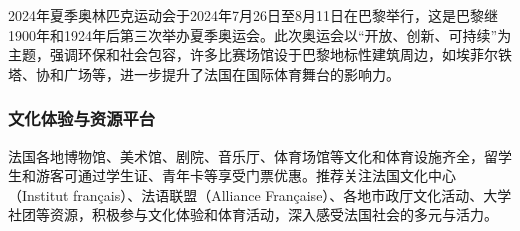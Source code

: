 2024年夏季奥林匹克运动会于2024年7月26日至8月11日在巴黎举行，这是巴黎继1900年和1924年后第三次举办夏季奥运会。此次奥运会以“开放、创新、可持续”为主题，强调环保和社会包容，许多比赛场馆设于巴黎地标性建筑周边，如埃菲尔铁塔、协和广场等，进一步提升了法国在国际体育舞台的影响力。

\subsubsection{文化体验与资源平台}
法国各地博物馆、美术馆、剧院、音乐厅、体育场馆等文化和体育设施齐全，留学生和游客可通过学生证、青年卡等享受门票优惠。推荐关注法国文化中心（Institut français）、法语联盟（Alliance Française）、各地市政厅文化活动、大学社团等资源，积极参与文化体验和体育活动，深入感受法国社会的多元与活力。
